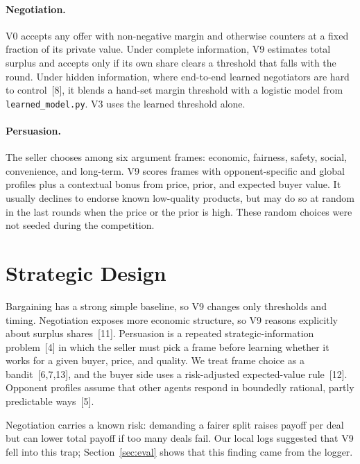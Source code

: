 \documentclass{article}
\begin{document}
\paragraph{Negotiation.}
V0 accepts any offer with non-negative margin and otherwise counters at a fixed fraction of its private value. Under complete information, V9 estimates total surplus and accepts only if its own share clears a threshold that falls with the round. Under hidden information, where end-to-end learned negotiators are hard to control~[8], it blends a hand-set margin threshold with a logistic model from \texttt{learned\_model.py}. V3 uses the learned threshold alone.

\paragraph{Persuasion.}
The seller chooses among six argument frames: economic, fairness, safety, social, convenience, and long-term. V9 scores frames with opponent-specific and global profiles plus a contextual bonus from price, prior, and expected buyer value. It usually declines to endorse known low-quality products, but may do so at random in the last rounds when the price or the prior is high. These random choices were not seeded during the competition.

\section{Strategic Design}

Bargaining has a strong simple baseline, so V9 changes only thresholds and timing. Negotiation exposes more economic structure, so V9 reasons explicitly about surplus shares~[11]. Persuasion is a repeated strategic-information problem~[4] in which the seller must pick a frame before learning whether it works for a given buyer, price, and quality. We treat frame choice as a bandit~[6,7,13], and the buyer side uses a risk-adjusted expected-value rule~[12]. Opponent profiles assume that other agents respond in boundedly rational, partly predictable ways~[5].

Negotiation carries a known risk: demanding a fairer split raises payoff per deal but can lower total payoff if too many deals fail. Our local logs suggested that V9 fell into this trap; Section~\ref{sec:eval} shows that this finding came from the logger.
\end{document}
